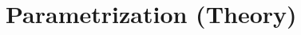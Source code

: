\documentclass[../document.tex]{subfiles}
\begin{document}
\section{Parametrization (Theory)}
\end{document}
